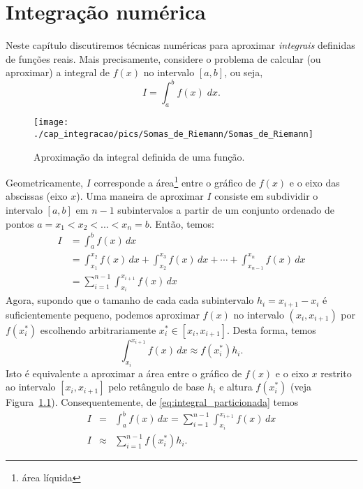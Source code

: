 
%

\chapter{Integração numérica} \label{cap:integracao}

Neste capítulo discutiremos técnicas numéricas para aproximar \emph{integrais} definidas de funções reais. Mais precisamente, considere o problema de calcular (ou aproximar) a integral de $f(x)$ no intervalo $[a,b]$, ou seja,
\begin{equation}
 I = \int_a^b f(x) \;dx.
\end{equation}

\begin{figure}
  \centering
  \texttt{[image: ./cap\_integracao/pics/Somas\_de\_Riemann/Somas\_de\_Riemann]}
  \caption{Aproximação da integral definida de uma função.}
  \label{fig:Somas_de_Riemann}
\end{figure}

Geometricamente, $I$ corresponde a área\footnote{área líquida} entre o gráfico de $f(x)$ e o eixo das abscissas (eixo $x$). Uma maneira de aproximar $I$ consiste em subdividir o intervalo $[a,b]$ em $n-1$ subintervalos a partir de um conjunto ordenado de pontos $a=x_1<x_2<...<x_n=b$. Então, temos:
\begin{equation}\label{eq:integral_particionada}
  \begin{split}
    I &= \int_a^b f(x)\,dx\\
    &= \int_{x_1}^{x_2}f(x)\,dx + \int_{x_2}^{x_3}f(x)\,dx + \cdots + \int_{x_{n-1}}^{x_{n}}f(x)\,dx\\
    &= \sum_{i=1}^{n-1}\int_{x_i}^{x_{i+1}}f(x)\,dx
  \end{split}
\end{equation}
Agora, supondo que o tamanho de cada cada subintervalo $h_i = x_{i+1}-x_{i}$ é suficientemente pequeno, podemos aproximar $f(x)$ no intervalo $(x_i, x_{i+1})$ por $f(x_i^*)$ escolhendo arbitrariamente $x_i^{*}\in [x_i, x_{i+1}]$. Desta forma, temos
\begin{equation}
  \int_{x_i}^{x_{i+1}}f(x)\,dx \approx f(x_i^*)h_i.
\end{equation}
Isto é equivalente a aproximar a área entre o gráfico de $f(x)$ e o eixo $x$ restrito ao intervalo $[x_i, x_{i+1}]$ pelo retângulo de base $h_i$ e altura $f(x_i^*)$ (veja Figura~\ref{fig:Somas_de_Riemann}). Consequentemente, de \eqref{eq:integral_particionada} temos
\begin{eqnarray}
  I &=& \int_{a}^{b}f(x)\,dx = \sum_{i=1}^{n-1}\int_{x_i}^{x_{i+1}}f(x)\,dx\\
  I &\approx& \sum_{i=1}^{n-1} f(x_i^*)h_i.
\end{eqnarray}

